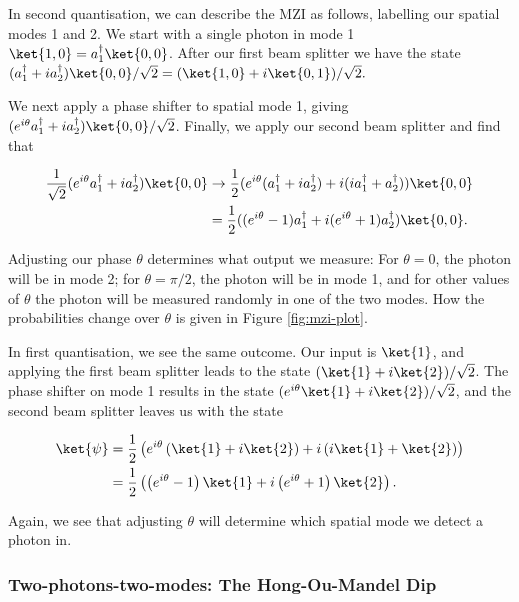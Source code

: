 In second quantisation, we can describe the MZI as follows, labelling our spatial modes 1 and 2. We start with a single photon in mode 1 $\ket{1,0} = a_1^\dagger\ket{0,0}$. After our first beam splitter we have the state $(a_1^\dagger + ia_2^\dagger)\ket{0,0}/\sqrt{2} = (\ket{1,0}+i\ket{0,1})/\sqrt{2}.$

We next apply a phase shifter to spatial mode 1, giving $(e^{i\theta}a_1^\dagger + ia_2^\dagger)\ket{0,0}/\sqrt{2}$. Finally, we apply our second beam splitter and find that

\begin{align}
\frac{1}{\sqrt{2}}(e^{i\theta}a_1^\dagger + ia_2^\dagger)\ket{0,0} &\rightarrow \frac{1}{2}(e^{i\theta}(a_1^\dagger+ia_2^\dagger) + i(ia_1^\dagger + a_2^\dagger))\ket{0,0}\\
&= \frac{1}{2}((e^{i\theta}-1)a_1^\dagger+i(e^{i\theta}+1)a_2^\dagger)\ket{0,0}.
\end{align}

Adjusting our phase $\theta$ determines what output we measure: For $\theta=0$, the photon will be in mode 2; for $\theta=\pi/2$, the photon will be in mode 1, and for other values of $\theta$ the photon will be measured randomly in one of the two modes. How the probabilities change over $\theta$ is given in Figure \ref{fig:mzi-plot}.

In first quantisation, we see the same outcome. Our input is $\ket{1}$, and  applying the first beam splitter leads to the state $(\ket{1}+i\ket{2})/\sqrt{2}$. The phase shifter on mode 1 results in the state $(e^{i\theta}\ket{1}+i\ket{2})/\sqrt{2}$, and the second beam splitter leaves us with the state

\begin{align}
\ket{\psi} &= \frac{1}{2}\left(e^{i\theta}\left(\ket{1} + i\ket{2}\right) + i\left(i\ket{1} + \ket{2}\right)\right)\\
&= \frac{1}{2}\left(\left(e^{i\theta}-1\right)\ket{1} + i\left(e^{i\theta}+1\right)\ket{2}\right).
\end{align}

Again, we see that adjusting $\theta$ will determine which spatial mode we detect a photon in.

\subsubsection{Two-photons-two-modes: The Hong-Ou-Mandel Dip}

